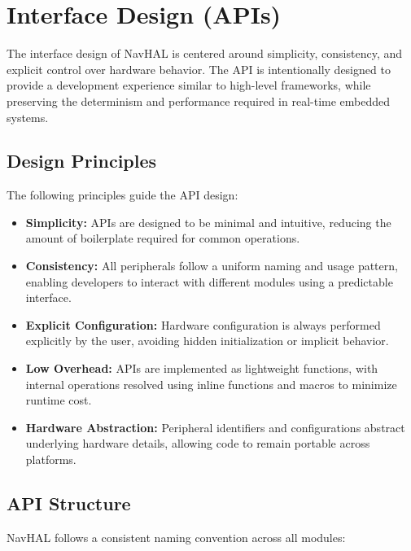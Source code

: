\section{Interface Design (APIs)}
\label{sec:navhal_interface_design}

The interface design of NavHAL is centered around simplicity, consistency, and explicit control over hardware behavior. The API is intentionally designed to provide a development experience similar to high-level frameworks, while preserving the determinism and performance required in real-time embedded systems.

\subsection*{Design Principles}

The following principles guide the API design:

\begin{itemize}
    \item \textbf{Simplicity:}  
    APIs are designed to be minimal and intuitive, reducing the amount of boilerplate required for common operations.

    \item \textbf{Consistency:}  
    All peripherals follow a uniform naming and usage pattern, enabling developers to interact with different modules using a predictable interface.

    \item \textbf{Explicit Configuration:}  
    Hardware configuration is always performed explicitly by the user, avoiding hidden initialization or implicit behavior.

    \item \textbf{Low Overhead:}  
    APIs are implemented as lightweight functions, with internal operations resolved using inline functions and macros to minimize runtime cost.

    \item \textbf{Hardware Abstraction:}  
    Peripheral identifiers and configurations abstract underlying hardware details, allowing code to remain portable across platforms.
\end{itemize}

\subsection*{API Structure}

NavHAL follows a consistent naming convention across all modules:

